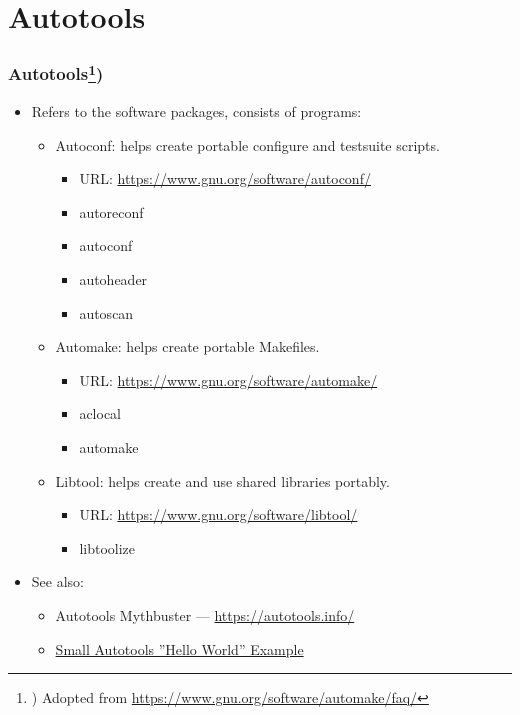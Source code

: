 \documentclass[aspectratio=169, xcolor=table, notheorems, hyperref={pdfpagelabels=false}]{beamer}
\begin{document}
\section{Autotools}
\begin{frame}
\frametitle{Autotools\footnote{%
) Adopted from \url{https://www.gnu.org/software/automake/faq/}%
})}

\begin{itemize}
\item Refers to the software packages, consists of programs:
\begin{itemize}
\item Autoconf: helps create portable configure and testsuite scripts.
\begin{itemize}
\item URL: \url{https://www.gnu.org/software/autoconf/}
\item autoreconf
\item autoconf
\item autoheader
\item autoscan
\end{itemize}
\item Automake: helps create portable Makefiles.
\begin{itemize}
\item URL: \url{https://www.gnu.org/software/automake/}
\item aclocal
\item automake
\end{itemize}
\item Libtool: helps create and use shared libraries portably. 
\begin{itemize}
\item URL: \url{https://www.gnu.org/software/libtool/}
\item libtoolize
\end{itemize}
\end{itemize}
\item See also:
\begin{itemize}
\item Autotools Mythbuster --- \url{https://autotools.info/}
\item \href{https://www.gnu.org/savannah-checkouts/gnu/automake/manual/automake.html\#Hello-World}{Small Autotools ''Hello World'' Example}
\end{itemize}
\end{itemize}

\end{frame}

\end{document}
